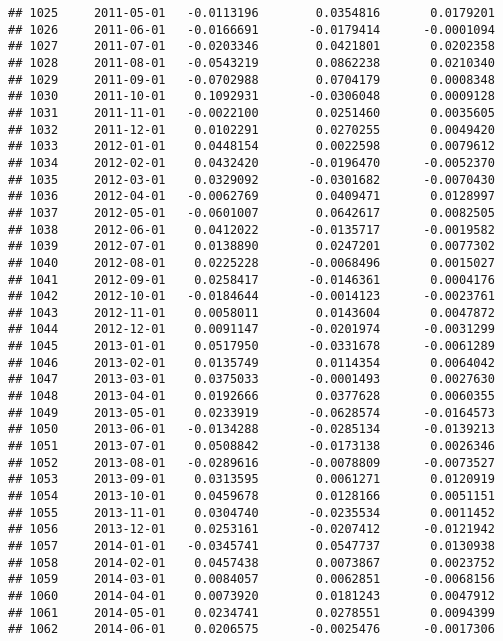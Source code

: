 \documentclass[
]{article}
\begin{document}
\begin{verbatim}
## 1025     2011-05-01   -0.0113196        0.0354816       0.0179201
## 1026     2011-06-01   -0.0166691       -0.0179414      -0.0001094
## 1027     2011-07-01   -0.0203346        0.0421801       0.0202358
## 1028     2011-08-01   -0.0543219        0.0862238       0.0210340
## 1029     2011-09-01   -0.0702988        0.0704179       0.0008348
## 1030     2011-10-01    0.1092931       -0.0306048       0.0009128
## 1031     2011-11-01   -0.0022100        0.0251460       0.0035605
## 1032     2011-12-01    0.0102291        0.0270255       0.0049420
## 1033     2012-01-01    0.0448154        0.0022598       0.0079612
## 1034     2012-02-01    0.0432420       -0.0196470      -0.0052370
## 1035     2012-03-01    0.0329092       -0.0301682      -0.0070430
## 1036     2012-04-01   -0.0062769        0.0409471       0.0128997
## 1037     2012-05-01   -0.0601007        0.0642617       0.0082505
## 1038     2012-06-01    0.0412022       -0.0135717      -0.0019582
## 1039     2012-07-01    0.0138890        0.0247201       0.0077302
## 1040     2012-08-01    0.0225228       -0.0068496       0.0015027
## 1041     2012-09-01    0.0258417       -0.0146361       0.0004176
## 1042     2012-10-01   -0.0184644       -0.0014123      -0.0023761
## 1043     2012-11-01    0.0058011        0.0143604       0.0047872
## 1044     2012-12-01    0.0091147       -0.0201974      -0.0031299
## 1045     2013-01-01    0.0517950       -0.0331678      -0.0061289
## 1046     2013-02-01    0.0135749        0.0114354       0.0064042
## 1047     2013-03-01    0.0375033       -0.0001493       0.0027630
## 1048     2013-04-01    0.0192666        0.0377628       0.0060355
## 1049     2013-05-01    0.0233919       -0.0628574      -0.0164573
## 1050     2013-06-01   -0.0134288       -0.0285134      -0.0139213
## 1051     2013-07-01    0.0508842       -0.0173138       0.0026346
## 1052     2013-08-01   -0.0289616       -0.0078809      -0.0073527
## 1053     2013-09-01    0.0313595        0.0061271       0.0120919
## 1054     2013-10-01    0.0459678        0.0128166       0.0051151
## 1055     2013-11-01    0.0304740       -0.0235534       0.0011452
## 1056     2013-12-01    0.0253161       -0.0207412      -0.0121942
## 1057     2014-01-01   -0.0345741        0.0547737       0.0130938
## 1058     2014-02-01    0.0457438        0.0073867       0.0023752
## 1059     2014-03-01    0.0084057        0.0062851      -0.0068156
## 1060     2014-04-01    0.0073920        0.0181243       0.0047912
## 1061     2014-05-01    0.0234741        0.0278551       0.0094399
## 1062     2014-06-01    0.0206575       -0.0025476      -0.0017306

\end{verbatim}
\end{document}
